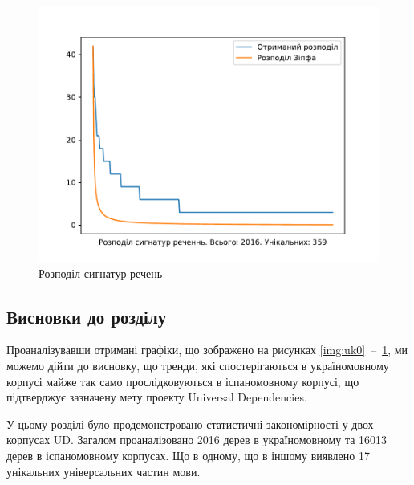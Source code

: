 \begin{multicols}{2}
\begin{figure}[H]
  \begin{center}
    \includegraphics[width=\linewidth]{article/images/chart_uk_sent_d_w_n.pdf}
  \end{center}
  \caption{Розподіл сигнатур речень}
  \label{img:es6}
\end{figure}
\end{multicols}

\subsection*{Висновки до розділу }
Проаналізувавши отримані графіки, що зображено на рисунках
\ref{img:uk0}~\nobreakdash--~\ref{img:es6},
ми можемо дійти до висновку, що тренди, які
спостерігаються в україномовному корпусі майже так само прослідковуються в
іспаномовному корпусі, що підтверджує зазначену мету проекту Universal Dependencies.

У цьому розділі було продемонстровано статистичні закономірності у двох
корпусах UD. Загалом проаналізовано 2016 дерев в україномовному та 16013 дерев
в іспаномовному корпусах. Що в одному, що в іншому виявлено 17 унікальних
універсальних частин мови.